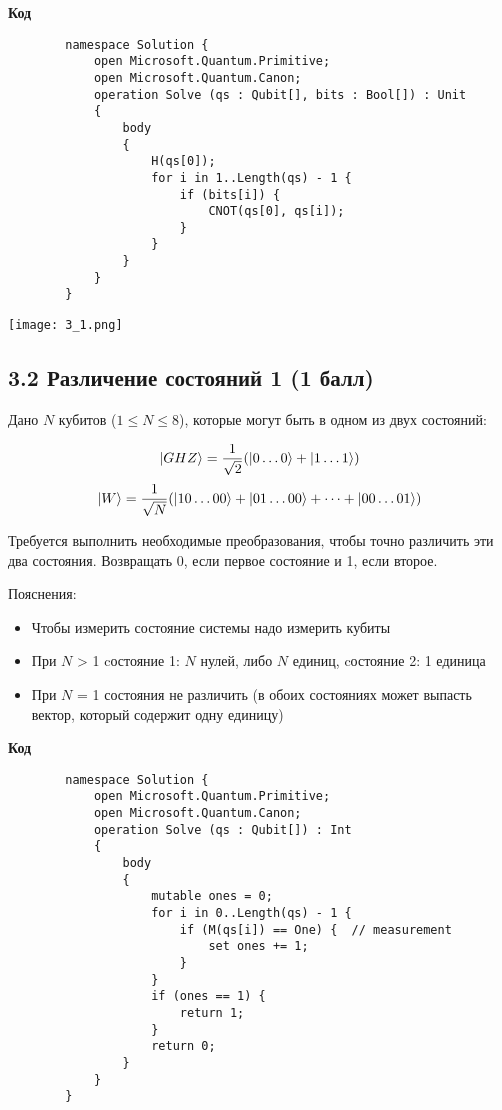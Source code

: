 \documentclass{article}
\DeclarePairedDelimiter\ket{\lvert}{\rangle}
\begin{document}
    \textbf{Код}
    
    \begin{lstlisting}
        namespace Solution {
            open Microsoft.Quantum.Primitive;
            open Microsoft.Quantum.Canon;
            operation Solve (qs : Qubit[], bits : Bool[]) : Unit 
            {
                body
                {
                    H(qs[0]);
                    for i in 1..Length(qs) - 1 {
                        if (bits[i]) {
                            CNOT(qs[0], qs[i]);
                        }
                    }
                }
            }
        }
    \end{lstlisting}
    \begin{center}
        \texttt{[image: 3\_1.png]} \\
    \end{center}


\newpage


\subsection*{3.2 Различение состояний 1 (1 балл)}

    Дано $N$ кубитов ($1 \le N \le 8$), которые могут быть в одном из двух состояний:
    
    $$\ket{GHZ} = \frac{1}{\sqrt2}(\ket{0\dots0} +\ket{1\dots1})$$
    $$\ket{W} = \frac{1}{\sqrt N}(\ket{10\dots00}+\ket{01\dots00} + \dots +\ket{00\dots01})$$
    
    Требуется выполнить необходимые преобразования, чтобы точно различить эти два состояния. Возвращать $0$, если первое состояние и 1, если второе. 
    
    Пояснения:
        
    \begin{itemize}
        \item Чтобы измерить состояние системы надо измерить кубиты
        \item При $N$ > 1 cостояние 1: $N$ нулей, либо $N$ единиц, cостояние 2: 1 единица
        \item При $N$ = 1 состояния не различить (в обоих состояниях может выпасть вектор, который содержит одну единицу)

    \end{itemize}
    
    \textbf{Код}

    \begin{lstlisting}
        namespace Solution {
            open Microsoft.Quantum.Primitive;
            open Microsoft.Quantum.Canon;
            operation Solve (qs : Qubit[]) : Int 
            {
                body
                {
                    mutable ones = 0;
                    for i in 0..Length(qs) - 1 {
                        if (M(qs[i]) == One) {  // measurement
                            set ones += 1;
                        }
                    }
                    if (ones == 1) {
                        return 1;
                    }
                    return 0;
                }
            }
        }
    \end{lstlisting}
 
\end{document}
